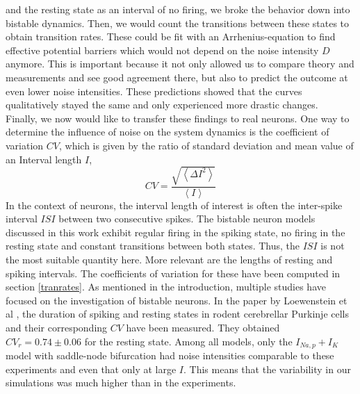 \documentclass[12pt,a4paper]{article}
\begin{document}
and the resting state as an interval of no firing, we broke the behavior down into bistable dynamics. Then, we would count the transitions between these states to obtain transition rates. These could be fit with an Arrhenius-equation to find effective potential barriers which would not depend on the noise intensity $D$ anymore. This is important because it not only allowed us to compare theory and measurements and see good agreement there, but also to predict the outcome at even lower noise intensities. These predictions showed that the curves qualitatively stayed the same and only experienced more drastic changes.\\
Finally, we now would like to transfer these findings to real neurons. One way to determine the influence of noise on the system dynamics is the coefficient of variation $CV$, which is given by the ratio of standard deviation and mean value of an Interval length $I$\cite{cvref},
\begin{equation}
CV=\frac{\sqrt{\left<\Delta I^2\right>}}{\left<I\right>}
\end{equation}  
In the context of neurons, the interval length of interest is often the inter-spike interval $ISI$ between two consecutive spikes. The bistable neuron models discussed in this work exhibit regular firing in the spiking state, no firing in the resting state and constant transitions between both states. Thus, the $ISI$ is not the most suitable quantity here. More relevant are the lengths of resting and spiking intervals. The coefficients of variation for these have been computed in section \ref{tranrates}. As mentioned in the introduction, multiple studies have focused on the investigation of bistable neurons. In the paper by Loewenstein et al \cite{sensorystm1}, the duration of spiking and resting states in rodent cerebrellar Purkinje cells and their corresponding $CV$ have been measured. They obtained $CV_r=0.74\pm0.06$ for the resting state. Among all models, only the $I_{Na,p}+I_K$ model with saddle-node bifurcation had noise intensities comparable to these experiments and even that only at large $I$. This means that the variability in our simulations was much higher than in the experiments. \\
\end{document}
